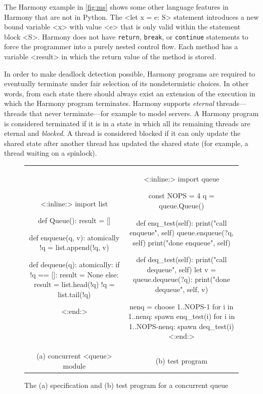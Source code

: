 \documentclass[twocolumn]{article}
\begin{document}
The Harmony example in \autoref{fig:ms} shows some other language
features in Harmony that are not in Python.
The <{let x = e: S}> statement introduces a new bound variable <{x}>
with value <{e}> that is only valid within the statement block <{S}>.
Harmony does not have \texttt{return}, \texttt{break}, or
\texttt{continue} statements to force the programmer into a purely
nested control flow.  Each method has a variable <{result}> in which
the return value of the method is stored.

In order to make deadlock detection possible, Harmony programs are
required to eventually terminate under fair selection of its
nondetermistic choices.  In other words, from each state there
should always exist an extension of the execution in which the
Harmony program terminates.  Harmony supports \emph{eternal}
threads---threads that never terminate---for example to model
servers.  A Harmony program is considered terminated if it is in a
state in which all its remaining threads are eternal and \emph{blocked}.
A thread is considered blocked if it can only update the shared
state after another thread has updated the shared state (for example,
a thread waiting on a spinlock).

\begin{figure}[h]
\begin{center}
\begin{tabular}{cc}
{\footnotesize
\begin{tcolorbox}[width=0.45\linewidth]
<{:inline:}>
import list

def Queue():
    result = []

def enqueue(q, v):
    atomically !q = list.append(!q, v)

def dequeue(q):
    atomically:
        if !q == []:
            result = None
        else:
            result = list.head(!q)
            !q = list.tail(!q)



<{:end:}>
\end{tcolorbox}
}
&
{\footnotesize
\begin{tcolorbox}[width=0.48\linewidth]
<{:inline:}>
import queue

const NOPS = 4
q = queue.Queue()

def enq_test(self):
    print("call enqueue", self)
    queue.enqueue(?q, self)
    print("done enqueue", self)

def deq_test(self):
    print("call dequeue", self)
    let v = queue.dequeue(?q):
        print("done dequeue", self, v)

nenq = choose {1..NOPS-1}
for i in {1..nenq}:      spawn enq_test(i)
for i in {1..NOPS-nenq}: spawn deq_test(i)
<{:end:}>
\end{tcolorbox}
}
\\
(a) concurrent <{queue}> module & (b) test program
\end{tabular}
\end{center}
\caption{The (a) specification and (b) test program for a concurrent queue}
\label{fig:queue}
\end{figure}
\end{document}
